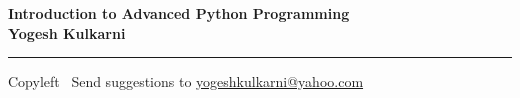 
\graphicspath{{images/}}

\footnotesize


\begin{center}
\Large{\textbf{Introduction to Advanced Python Programming\\ Yogesh Kulkarni}}  
\end{center}

\begin{multicols}{2}
		
\end{multicols}

\rule{\linewidth}{0.25pt}
\scriptsize
Copyleft \textcopyleft\  Send suggestions to 
\href{http://www.yogeshkulkarni.com}{yogeshkulkarni@yahoo.com}


